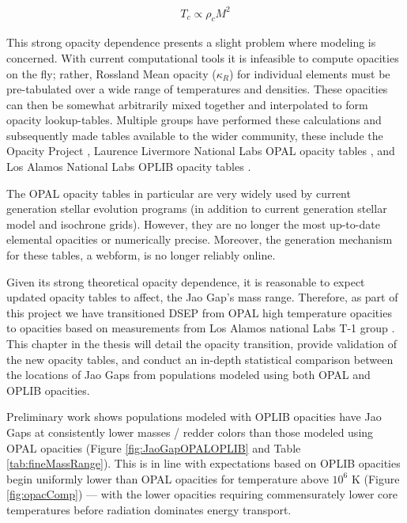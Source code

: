 \begin{align}\label{eqn:TMRelation}
	T_{c} \propto \rho_{c}M^{2}
\end{align}

This strong opacity dependence presents a slight problem where modeling is 
concerned. With current computational tools it is infeasible to compute opacities on the
fly; rather, Rossland Mean opacity ($\kappa_{R}$) for individual elements must
be pre-tabulated over a wide range of temperatures and densities. These
opacities can then be somewhat arbitrarily mixed together and interpolated to
form opacity lookup-tables. Multiple groups have performed these calculations
and subsequently made tables available to the wider community, these include
the Opacity Project \citep[OP][]{Seaton1994}, Laurence Livermore National Labs
OPAL opacity tables \citep{Iglesias1996}, and Los Alamos National Labs OPLIB
opacity tables \citep{Colgan2016}.

The OPAL opacity tables in particular are very widely used by current
generation stellar evolution programs (in addition to current generation
stellar model and isochrone grids). However, they are no longer the most
up-to-date elemental opacities or numerically precise. Moreover, the generation
mechanism for these tables, a webform, is no longer reliably online.  

Given its strong theoretical opacity dependence, it is reasonable to expect
updated opacity tables to affect, the Jao Gap's mass range. Therefore, as part
of this project we have transitioned DSEP from OPAL high temperature opacities
to opacities based on measurements from Los Alamos national Labs T-1 group
\citep[OPLIB][]{Colgan2016}. This chapter in the thesis will detail the opacity
transition, provide validation of the new opacity tables, and conduct an
in-depth statistical comparison between the locations of Jao Gaps from
populations modeled using both OPAL and OPLIB opacities.

Preliminary work shows populations modeled with OPLIB opacities have Jao Gaps
at consistently lower masses / redder colors than those modeled using OPAL
opacities (Figure \ref{fig:JaoGapOPALOPLIB} and Table \ref{tab:fineMassRange}).
This is in line with expectations based on OPLIB opacities begin uniformly
lower than OPAL opacities for temperature above $10^{6}$ K (Figure
\ref{fig:opacComp}) --- with the lower opacities requiring commensurately lower
core temperatures before radiation dominates energy transport. 

